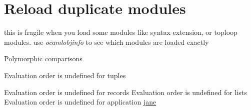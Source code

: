 
\section{Reload duplicate modules }

 this is fragile when you load some modules like syntax extension, or toploop modules. use \textit{ocamlobjinfo} to
  see which modules are loaded exactly


Polymorphic comparisons

Evaluation order is undefined for tuples

Evaluation order is undefined for records
Evaluation order is undefined for lists
Evaluation order is undefined for application 
\href{https://ocaml.janestreet.com/?q=node/33}{jane}
